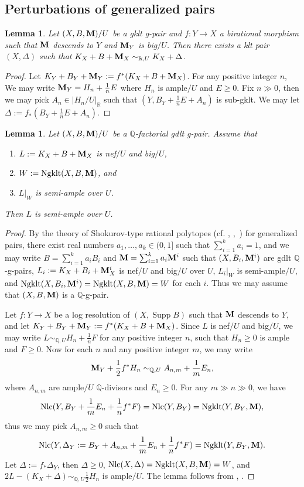 \documentclass[11pt]{amsart}
\numberwithin{equation}{section}
\newcommand{\Mm}{{\bf{M}}}
\newcommand{\Qq}{\mathbb{Q}}
\newcommand{\Supp}{\operatorname{Supp}}
\newcommand{\Ngklt}{\operatorname{Ngklt}}
\newcommand{\Nlc}{\operatorname{Nlc}}
\newtheorem{lem}[thm]{Lemma}
\theoremstyle{definition}
\theoremstyle{definition}
\theoremstyle{definition}
\begin{document}
\subsection{Perturbations of generalized pairs}


\begin{lem}\label{lem: gklt g-pair to pair}
Let $(X,B,\Mm)/U$ be a gklt g-pair and $f: Y\rightarrow X$ a birational morphism such that $\Mm$ descends to $Y$ and $\Mm_Y$ is big$/U$. Then there exists a klt pair $(X,\Delta)$ such that $K_X+B+\Mm_X\sim_{\mathbb R,U}K_X+\Delta$.
\end{lem}
\begin{proof}
Let $K_Y+B_Y+\Mm_Y:=f^*(K_X+B+\Mm_X)$. For any positive integer $n$, We may write $\Mm_Y=H_n+\frac{1}{n}E$ where $H_n$ is ample$/U$ and $E\geq 0$. Fix $n\gg 0$, then we may pick $A_n\in |H_n/U|_{\mathbb R}$ such that $(Y,B_Y+\frac{1}{n}E+A_n)$ is sub-gklt. We may let $\Delta:=f_*(B_Y+\frac{1}{n}E+A_n)$. 
\end{proof}

\begin{lem}\label{lem: reduction to Nlc locus}
Let $(X,B,\Mm)/U$ be a $\Qq$-factorial gdlt g-pair. Assume that
\begin{enumerate}
    \item $L:=K_X+B+\Mm_X$ is nef$/U$ and big$/U$, 
    \item $W:=\Ngklt(X,B,\Mm)$, and
    \item $L|_W$ is semi-ample over $U$.
\end{enumerate}
Then $L$ is semi-ample over $U$.
\end{lem}
\begin{proof}
By the theory of Shokurov-type rational polytopes (cf.  \cite[Proposition 3.16]{HL22}, \cite[Lemma 5.3]{HLS19},~\cite[Theorem 1.4]{Che20}) for generalized pairs, there exist real numbers $a_1,\dots,a_k\in (0,1]$ such that $\sum_{i=1}^ka_i=1$, and we may write $B=\sum_{i=1}^ka_iB_i$ and $\Mm=\sum_{i=1}^ka_i\Mm^i$ such that $(X,B_i,\Mm^i)$ are gdlt $\mathbb Q$-g-pairs, $L_i:=K_X+B_i+\Mm^i_X$ is nef$/U$ and big$/U$ over $U$, $L_i|_W$ is semi-ample$/U$, and $\Ngklt(X,B_i,\Mm^i)=\Ngklt(X,B,\Mm)=W$ for each $i$. Thus we may assume that $(X,B,\Mm)$ is a $\mathbb Q$-g-pair.

Let $f:Y\to X$ be a log resolution of $(X,\Supp B)$ such that $\Mm$ descends to $Y$, and let $K_Y+B_Y+\Mm_Y:=f^*(K_X+B+\Mm_X)$. Since $L$ is nef$/U$ and big$/U$, we may write $L\sim_{\mathbb Q,U}H_n+\frac{1}{n}F$ for any positive integer $n$, such that $H_n\geq 0$ is ample and $F\geq 0$. Now for each $n$ and any positive integer $m$, we may write 
$$\Mm_Y+\frac{1}{2}f^*H_n\sim_{\mathbb Q,U}A_{n,m}+\frac{1}{m}E_{n},$$
where $A_{n,m}$ are ample$/U$ $\mathbb Q$-divisors and $E_n\geq 0$. For any $m\gg n\gg 0$, we have
$$\Nlc(Y,B_Y+\frac{1}{m}E_n+\frac{1}{n}f^*F)=\Nlc(Y,B_Y)=\Ngklt(Y,B_Y,\Mm),$$
thus we may pick $A_{n,m}\geq 0$ such that $$\Nlc(Y,\Delta_Y:=B_Y+A_{n,m}+\frac{1}{m}E_n+\frac{1}{n}f^*F)=\Ngklt(Y,B_Y,\Mm).$$
Let $\Delta:=f_*\Delta_Y$, then $\Delta\geq 0$, $\Nlc(X,\Delta)=\Ngklt(X,B,\Mm)=W$, and $2L-(K_X+\Delta)\sim_{\mathbb Q,U}\frac{1}{2}H_n$ is ample$/U$. The lemma follows from \cite[Theorems 4.5.5, 6.5.1]{Fuj17}, \cite[Theroem 5.3]{Amb03}.
\end{proof}
\end{document}
